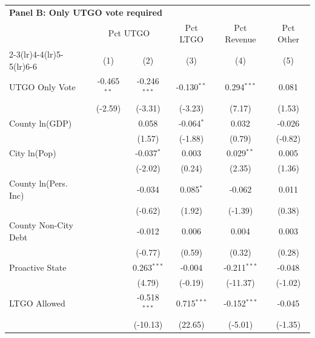 \begingroup
\centering
\begin{tabular*}{\textwidth}{@{\extracolsep{\fill}}lccccc}
\multicolumn{5}{l}{\textbf{Panel B: Only UTGO vote required}}\\

\addlinespace
   \toprule
    & \multicolumn{2}{c}{Pct UTGO} & Pct LTGO & Pct Revenue & Pct Other\\
   \cmidrule(lr){2-3}\cmidrule(lr){4-4}\cmidrule(lr){5-5}\cmidrule(lr){6-6}
                        & (1)           & (2)            & (3)            & (4)            & (5)\\  
   \midrule 
   UTGO Only Vote       & -0.465$^{**}$ & -0.246$^{***}$ & -0.130$^{**}$  & 0.294$^{***}$  & 0.081\\   
                        & (-2.59)      & (-3.31)       & (-3.23)       & (7.17)        & (1.53)\\   
   County ln(GDP)       &               & 0.058          & -0.064$^{*}$   & 0.032          & -0.026\\   
                        &               & (1.57)        & (-1.88)       & (0.79)        & (-0.82)\\   
   City ln(Pop)         &               & -0.037$^{*}$   & 0.003          & 0.029$^{**}$   & 0.005\\   
                        &               & (-2.02)       & (0.24)        & (2.35)        & (1.36)\\   
   County ln(Pers. Inc) &               & -0.034         & 0.085$^{*}$    & -0.062         & 0.011\\   
                        &               & (-0.62)       & (1.92)        & (-1.39)       & (0.38)\\   
   County Non-City Debt &               & -0.012         & 0.006          & 0.004          & 0.003\\   
                        &               & (-0.77)       & (0.59)        & (0.32)        & (0.28)\\   
   Proactive State      &               & 0.263$^{***}$  & -0.004         & -0.211$^{***}$ & -0.048\\   
                        &               & (4.79)        & (-0.19)       & (-11.37)      & (-1.02)\\   
   LTGO Allowed         &               & -0.518$^{***}$ & 0.715$^{***}$  & -0.152$^{***}$ & -0.045\\   
                        &               & (-10.13)      & (22.65)       & (-5.01)       & (-1.35)\\   

\end{tabular*}
